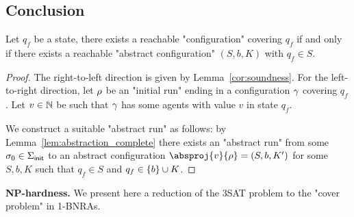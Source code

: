 \subsection{Conclusion}


\begin{proposition}
	\label{prop:sound-and-complete}
	Let $q_f$ be a state, there exists a reachable "configuration" covering $q_f$ if and only if there exists a reachable "abstract configuration" $(S,b,K)$ with $q_f \in S$.
\end{proposition}

\begin{proof}
	The right-to-left direction is given by Lemma~\ref{cor:soundness}.
	For the left-to-right direction, let $\rho$ be an "initial run" ending in a configuration $\gamma$ covering $q_f$. Let $v \in \mathbb{N}$ be such that $\gamma$ has some agents with value $v$ in state $q_f$.
	
	We construct a suitable "abstract run" as follows: by Lemma~\ref{lem:abstraction_complete} there exists an "abstract run" from some $\sigma_0 \in \Sigma_{\mathsf{init}}$ to an abstract configuration $\absproj{v}{\run} = (S, b, K')$ for some $S,b,K$ such that $q_f \in S$ and $q_f \in \{b\} \cup K$.
	
\end{proof}




\textbf{NP-hardness.} We present here a reduction of the 3SAT problem to the "cover problem" in 1-BNRAs.

